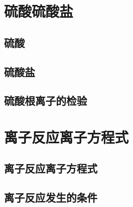 \section{硫酸\texorpdfstring{\quad}{ }硫酸盐}
\subsection{硫酸}
\subsection{硫酸盐}
\subsection{硫酸根离子的检验}
\begin{Practice}[习题]
  \begin{question}
    \item 
    \begin{tasks}
      \task
      \task
      \task
      \task
      \task
    \end{tasks}
    \item 
    \item 
    \item 
    \item 
  \end{question}
\end{Practice}
\section{离子反应\texorpdfstring{\quad}{ }离子方程式}
\subsection{离子反应\texorpdfstring{\quad}{ }离子方程式}
\subsection{离子反应发生的条件}
\begin{Practice}[习题]
  \begin{question}
    \item 
    \begin{tasks}
      \task
      \task
      \task
      \task
      \task
      \task
    \end{tasks}
    \item 
    \item 
    \begin{tasks}
      \task
      \task
      \task
      \task
      \task
    \end{tasks} 
    \item 
    \item 
  \end{question}
\end{Practice}
